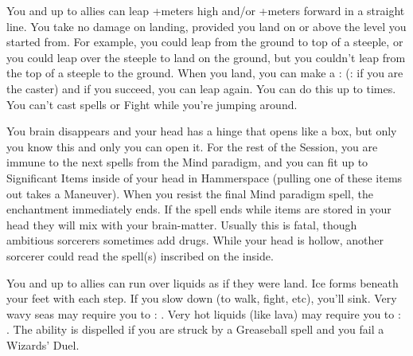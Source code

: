{You and up to  allies can leap \VIG+\SUMDICE meters high and/or
\VIG+\SUMDICE meters forward in a straight line.  You take no damage on
landing, provided you land on or above the level you started from. For
example, you could leap from the ground to top of a steeple, or you could
leap over the steeple to land on the ground, but you couldn't leap from the
top of a steeple to the ground.  When you land, you can make a \RS : \DEX
(\RS : \INT if you are the caster) and if you succeed,
you can leap again. You can do this up to \DICE times.  You can't cast
spells or Fight while you're jumping around.





\SPELL[
  Name=Hollow Head,
  Link=wizardry-hollow-head,
  Paradigm=Biomancy,
  Save=N,
  Duration=Session,
  Counter=n/a ,
  Keywords=Hammerspace,
  Target=Self
]



You brain disappears and your head has a hinge that opens like a box, but
only you know this and only you can open it. For the rest of the Session,
you are immune to the next \DICE spells from the Mind paradigm, and you can
fit up to \SUMDICE Significant Items inside of your head in Hammerspace
(pulling one of these items out takes a Maneuver).  When you resist the
final Mind paradigm spell, the enchantment immediately ends. If the spell
ends while items are stored in your head they will mix with your
brain-matter. Usually this is fatal, though ambitious sorcerers sometimes
add drugs.  While your head is hollow, another sorcerer could read the
spell(s) inscribed on the inside.




\SPELL[
  Name=Ice Bridge Step,
  Link=wizardry-ice-bridge-step,
  Paradigm=Elements,
  Save=N,
  Duration=Session,
  Counter=\mylink{Greaseball}{wizardry-greaseball} ,
  Keywords=None,
  Target=Self
]



You and up to  allies can run over liquids as if they were land.  Ice
forms beneath your feet with each step. If you slow down (to walk, fight,
etc), you'll sink. Very wavy seas may require you to \RS : \DEX.  Very hot
liquids (like lava) may require you to \RS : \INT.  The ability is dispelled
if you are struck by a Greaseball spell and you fail a Wizards' Duel.





\SPELL[
  Name=Icebolt,
  Link=wizardry-icebolt,
  Paradigm=Elements,
  Save=Y (half),
  Duration=0 / Markovian,
  Counter=n/a ,
  Keywords=None,
  Target=Close or Nearby point (straight line)
]



}
